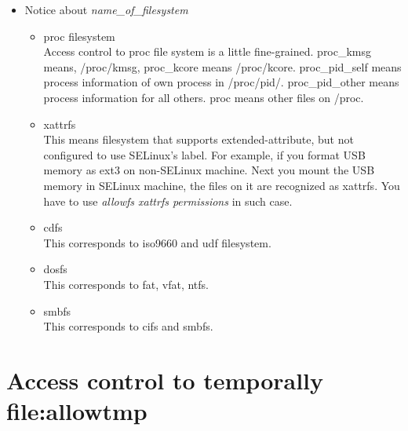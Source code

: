 \documentclass{article}
\begin{document}
\begin{itemize}
 \item Notice about {\it name\_of\_filesystem}
       \begin{itemize}
	\item proc filesystem\\
	      Access control to proc file system is a little
	      fine-grained. proc\_kmsg means, /proc/kmsg, proc\_kcore
	      means /proc/kcore. proc\_pid\_self means process information of
	      own process in /proc/pid/. proc\_pid\_other means process information for all
	      others. proc means other files on /proc. 
	\item xattrfs\\
	      This means filesystem that supports extended-attribute,
	      but not configured to use SELinux's label. For example, if
	      you format USB memory as ext3 on non-SELinux machine. Next
	      you mount the USB memory in SELinux machine, 
	      the files on it are recognized
	      as xattrfs. You have to use {\it allowfs xattrfs
	      permissions} in such case.
	\item cdfs\\
	      This corresponds to iso9660 and udf filesystem.
	\item dosfs\\
	      This corresponds to fat, vfat, ntfs.
	\item smbfs\\
	      This corresponds to cifs and smbfs.
       \end{itemize}
\end{itemize}

\section{Access control to temporally file:allowtmp}
\end{document}
